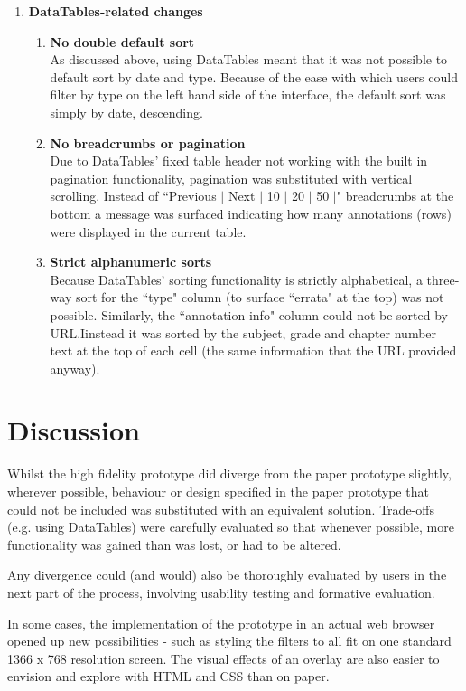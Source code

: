 \begin{enumerate}
\item \textbf{DataTables-related changes}
  \begin{enumerate}
    \item \textbf{No double default sort}\\
    As discussed above, using DataTables meant that it was not possible to default sort by date and type. Because of the ease with which users could filter by type on the left hand side of the interface, the default sort was simply by date, descending. 
    \item \textbf{No breadcrumbs or pagination}\\
    Due to DataTables' fixed table header not working with the built in pagination functionality, pagination was substituted with vertical scrolling. Instead of ``Previous $\vert$ Next $\vert$ 10 $\vert$ 20 $\vert$ 50 $\vert$" breadcrumbs at the bottom a message was surfaced indicating how many annotations (rows) were displayed in the current table.
    \item \textbf{Strict alphanumeric sorts}\\
    Because DataTables' sorting functionality is strictly alphabetical, a three-way sort for the ``type" column (to surface ``errata" at the top) was not possible. Similarly, the ``annotation info" column could not be sorted by URL.Iinstead it was sorted by the subject, grade and chapter number text at the top of each cell (the same information that the URL provided anyway). 
  \end{enumerate}
  
\end{enumerate}

\section{Discussion}
Whilst the high fidelity prototype did diverge from the paper prototype slightly, wherever possible, behaviour or design specified in the paper prototype that could not be included was substituted with an equivalent solution. Trade-offs (e.g. using DataTables) were carefully evaluated so that whenever possible, more functionality was gained than was lost, or had to be altered. 

Any divergence could (and would) also be thoroughly evaluated by users in the next part of the process, involving usability testing and formative evaluation. 

In some cases, the implementation of the prototype in an actual web browser opened up new possibilities - such as styling the filters to all fit on one standard 1366 x 768 resolution screen. The visual effects of an overlay are also easier to envision and explore with HTML and CSS than on paper. 

